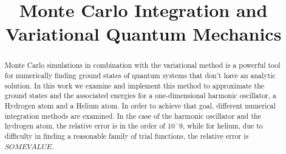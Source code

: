 \documentclass[conference]{IEEEtran}
\begin{document}
\title{Monte Carlo Integration and Variational Quantum Mechanics}


\author{
\and
{}
\and
{}
}


\maketitle


\begin{abstract}

Monte Carlo simulations in combination with the variational method is a powerful tool for numerically finding ground states of quantum systems that don't have an analytic solution. In this work we examine and implement this method to approximate the ground states and the associated energies for a one-dimensional harmonic oscillator, a Hydrogen atom and a Helium atom. In order to achieve that goal, different numerical integration methods are examined. In the case of the harmonic oscillator and the hydrogen atom, the relative error is in the order of $10^-9$, while for helium, due to difficulty in finding a reasonable family of trial functions, the relative error is $SOME VALUE$. 

\end{abstract}

\IEEEpeerreviewmaketitle















\end{document}
